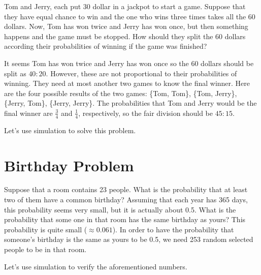 \begin{example}
Tom and Jerry, each put 30 dollar in a jackpot to start a game. Suppose that
they have equal chance to win and the one who wins three times takes all the 60
dollars. Now, Tom has won twice and Jerry has won once, but then something
happens and the game must be stopped. How should they split the 60 dollars
according their probabilities of winning if the game was finished?
\end{example}

It seems Tom has won twice and Jerry has won once so the 60 dollars should be
split as $40:20$. However, these are not proportional to their probabilities of
winning. They need at most another two games to know the final winner. Here are
the four possible results of the two games: \{Tom, Tom\}, \{Tom, Jerry\},
\{Jerry, Tom\}, \{Jerry, Jerry\}. The probabilities that Tom and Jerry would be
the final winner are $\frac{3}{4}$ and $\frac{1}{4}$, respectively, so the fair
division should be $45:15$.

Let's use simulation to solve this problem.




\hypertarget{birthday-problem}{%
  \section{Birthday Problem}\label{birthday-problem}}

\begin{example}
Suppose that a room contains 23 people. What is the probability that
at least two of them have a common birthday? Assuming that each year has 365
days, this probability seems very small, but it is actually about
0.5. What is the probability that some one in that room has the same
birthday as yours? This probability is quite small
($\approx0.061$). In order to have the probability that someone's
birthday is the same as yours to be 0.5, we need 253 random selected people to
be in that room.
\end{example}

Let's use simulation to verify the aforementioned numbers.




